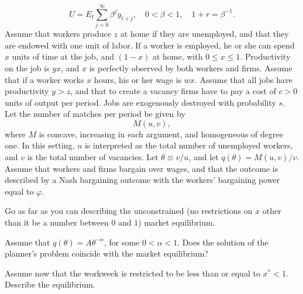 $$ U = E_t \sum_{j=0}^\infty \beta^j y_{t+j}, \quad
0 < \beta < 1, \quad
1 + r = \beta^{-1}.  $$
 \noindent
Assume that workers produce $z$ at home if they are unemployed, and that they are
endowed with one unit of labor.  If a worker is employed, he or she can spend $x$ units
of time at the job, and $(1-x)$ at home, with $0\leq x \leq 1$.  Productivity on the
job is $yx$, and $x$ is perfectly observed by both workers and firms.
\medskip
\noindent
Assume that if a worker works $x$ hours, his or her wage is $wx$.
\medskip
\noindent
Assume that all jobs have productivity $y>z$, and that to create a vacancy
firms have to pay a cost of $c>0$ units of output per period.  Jobs are exogenously destroyed
with probability $s$.  Let the number of matches per period be given by
$$ M(u,v),  $$
where $M$ is concave, increasing in each argument, and homogeneous of degree one.
In this setting, $u$ is interpreted as the total number of unemployed workers,
and $v$ is the total number of vacancies.  Let $\theta \equiv v/u$, and let
$q(\theta) = M(u,v)/v$.
\medskip
\noindent
Assume that workers and firms bargain over wages, and that the outcome is
described by a Nash bargaining outcome with the workers' bargaining power
equal to $\varphi$.
\medskip

 Go as far as you can describing the unconstrained (no restrictions on
$x$ other than it be a number between $0$ and $1$) market equilibrium.
\medskip

 Assume that $q(\theta) = A\theta^{-\alpha}$, for some $0 < \alpha < 1$.
Does the solution of the planner's problem coincide with the market equilibrium?
\medskip

 Assume now that the workweek is restricted to be less than or
equal to $x^* < 1$.  Describe the equilibrium.
\medskip

